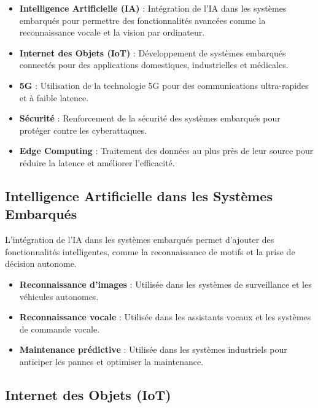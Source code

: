\documentclass[10pt,a4paper]{article}
\begin{document}
\begin{itemize}
    \item \textbf{Intelligence Artificielle (IA)} : Intégration de l'IA dans les systèmes embarqués pour permettre des fonctionnalités avancées comme la reconnaissance vocale et la vision par ordinateur.
    \item \textbf{Internet des Objets (IoT)} : Développement de systèmes embarqués connectés pour des applications domestiques, industrielles et médicales.
    \item \textbf{5G} : Utilisation de la technologie 5G pour des communications ultra-rapides et à faible latence.
    \item \textbf{Sécurité} : Renforcement de la sécurité des systèmes embarqués pour protéger contre les cyberattaques.
    \item \textbf{Edge Computing} : Traitement des données au plus près de leur source pour réduire la latence et améliorer l'efficacité.
\end{itemize}


\subsection*{Intelligence Artificielle dans les Systèmes Embarqués}

L'intégration de l'IA dans les systèmes embarqués permet d'ajouter des fonctionnalités intelligentes, comme la reconnaissance de motifs et la prise de décision autonome.

\begin{itemize}
    \item \textbf{Reconnaissance d'images} : Utilisée dans les systèmes de surveillance et les véhicules autonomes.
    \item \textbf{Reconnaissance vocale} : Utilisée dans les assistants vocaux et les systèmes de commande vocale.
    \item \textbf{Maintenance prédictive} : Utilisée dans les systèmes industriels pour anticiper les pannes et optimiser la maintenance.
\end{itemize}


\subsection*{Internet des Objets (IoT)}
\end{document}
